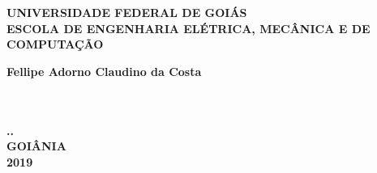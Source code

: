 \thispagestyle{empty}

\vfill
 \begin{center}
    

    {\large\bfseries UNIVERSIDADE FEDERAL DE GOIÁS} \\
    
   
    {\large\bfseries ESCOLA DE ENGENHARIA ELÉTRICA, MECÂNICA E DE COMPUTAÇÃO}  \\ 

    \vspace*{1in}
    \begin{large} \bfseries Fellipe Adorno Claudino da Costa \end{large}\\[0.4in]

    \vspace*{4cm}
    \noindent \\
    
    \large\bfseries{..} \\
    \vfill
    \large\bfseries{ GOIÂNIA \\ 2019}
\end{center}

\normalsize


